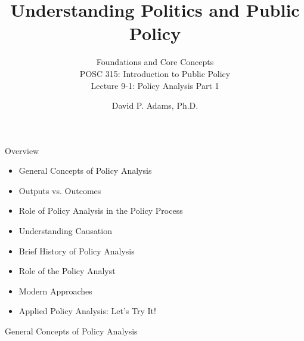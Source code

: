 \documentclass[10pt]{beamer}
\begin{document}
\title{Understanding Politics and Public Policy}
\subtitle{Foundations and Core Concepts\\POSC 315: Introduction to Public Policy\\Lecture 9-1: Policy Analysis Part 1}
\date{David P. Adams, Ph.D.}

\maketitle


\begin{frame}{Overview}

\begin{block}{}
    \begin{itemize}
        \item General Concepts of Policy Analysis
        \item Outputs vs. Outcomes
        \item Role of Policy Analysis in the Policy Process
        \item Understanding Causation
        \item Brief History of Policy Analysis
        \item Role of the Policy Analyst
        \item Modern Approaches
        \item Applied Policy Analysis: Let's Try It!
    \end{itemize}
\end{block}

\end{frame}


\begin{frame}{General Concepts of Policy Analysis}


\end{frame}
\end{document}
